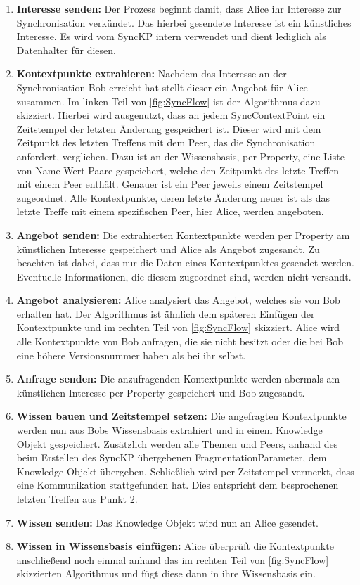 \documentclass[a4paper]{article}
\begin{document}
	\begin{enumerate}
		\item \textbf{Interesse senden:} Der Prozess beginnt damit, dass Alice
		ihr Interesse zur Synchronisation verkündet. Das hierbei gesendete
		Interesse ist ein künstliches Interesse. Es wird vom SyncKP intern
		verwendet und dient lediglich als Datenhalter für diesen.
		\item \textbf{Kontextpunkte extrahieren:} Nachdem das Interesse an der
		Synchronisation Bob erreicht hat stellt dieser ein Angebot für Alice
		zusammen. Im linken Teil von \autoref{fig:SyncFlow} ist der
		Algorithmus dazu skizziert. Hierbei wird ausgenutzt, dass an jedem
		SyncContextPoint ein Zeitstempel der letzten Änderung gespeichert ist.
		Dieser wird mit dem Zeitpunkt des letzten Treffens mit dem Peer,
		das die Synchronisation anfordert, verglichen. Dazu ist an der
		Wissensbasis, per Property, eine Liste von Name-Wert-Paare gespeichert, 
		welche den Zeitpunkt des letzte Treffen mit einem Peer enthält.
		Genauer ist ein Peer jeweils einem Zeitstempel zugeordnet. Alle
		Kontextpunkte, deren letzte Änderung neuer ist als das letzte Treffe mit
		einem spezifischen Peer, hier Alice, werden angeboten.
		\item \textbf{Angebot senden:} Die extrahierten Kontextpunkte werden per
		Property am künstlichen Interesse gespeichert und Alice als Angebot
		zugesandt. Zu beachten	ist dabei, dass nur die Daten eines Kontextpunktes
		gesendet werden. Eventuelle Informationen, die diesem zugeordnet sind,
		werden nicht versandt.
		\item \textbf{Angebot analysieren:} Alice analysiert das Angebot, welches
		sie von Bob erhalten hat. Der Algorithmus ist ähnlich dem späteren Einfügen
		der Kontextpunkte und im rechten Teil von \autoref{fig:SyncFlow}
		skizziert. Alice wird alle Kontextpunkte von Bob anfragen, die sie
		nicht besitzt oder die bei Bob eine höhere Versionsnummer haben als
		bei ihr selbst.
		\item \textbf{Anfrage senden:} Die anzufragenden Kontextpunkte werden
		abermals am künstlichen Interesse per Property gespeichert und Bob
		zugesandt.  
		\item \textbf{Wissen bauen und Zeitstempel setzen:} Die angefragten
		Kontextpunkte werden nun aus Bobs Wissensbasis extrahiert und in einem
		Knowledge Objekt gespeichert. Zusätzlich werden	alle Themen und Peers,
		anhand des beim Erstellen des SyncKP übergebenen FragmentationParameter,
		dem Knowledge Objekt übergeben. Schließlich wird per Zeitstempel vermerkt,
		dass eine Kommunikation stattgefunden hat. Dies entspricht dem
		besprochenen letzten Treffen aus Punkt 2.
		\item \textbf{Wissen senden:} Das Knowledge Objekt wird nun an Alice
		gesendet.
		\item \textbf{Wissen in Wissensbasis einfügen:} Alice überprüft 
		die Kontextpunkte anschließend noch einmal anhand das im rechten Teil von
		\autoref{fig:SyncFlow} skizzierten Algorithmus und fügt diese dann in
		ihre Wissensbasis ein.
	\end{enumerate} 	
	
\end{document}
